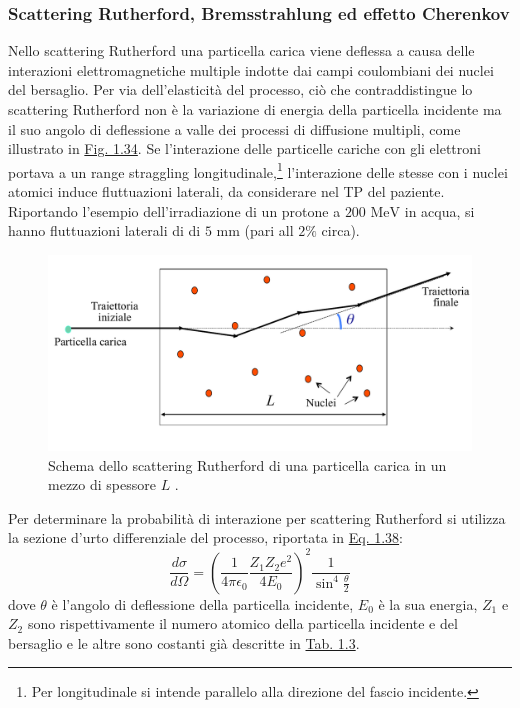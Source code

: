 \documentclass[12pt,a4paper,twoside]{report}
\begin{document}
	\subsubsection{Scattering Rutherford, Bremsstrahlung ed effetto Cherenkov}\label{par:scattering_Rutherford}
	Nello scattering Rutherford una particella carica viene deflessa a causa delle interazioni elettromagnetiche multiple indotte dai campi coulombiani dei nuclei del bersaglio. Per via dell'elasticità del processo, ciò che contraddistingue lo scattering Rutherford non è la variazione di energia della particella incidente ma il suo angolo di deflessione a valle dei processi di diffusione multipli, come illustrato in \hyperref[fig:rutherford_scattering]{Fig. 1.34}. Se l'interazione delle particelle cariche con gli elettroni portava a un range straggling longitudinale,\footnote{Per longitudinale si intende parallelo alla direzione del fascio incidente.} l'interazione delle stesse con i nuclei atomici induce fluttuazioni laterali, da considerare nel TP del paziente. Riportando l'esempio dell'irradiazione di un protone a $200\mbox{ MeV}$ in acqua, si hanno fluttuazioni laterali di di $5\mbox{ mm}$ (pari all $2\%$ circa).
	\begin{figure}[H]
		\centering
		\includegraphics[width=0.9\linewidth]{rutherford_scattering.pdf}
		\caption{Schema dello scattering Rutherford di una particella carica in un mezzo di spessore $L$ \cite{batignaniNotes}.}
		\label{fig:rutherford_scattering}
	\end{figure}
	Per determinare la probabilità di interazione per scattering Rutherford si utilizza la sezione d'urto differenziale del processo, riportata in \hyperref[eq:rutherford_scattering]{Eq. 1.38}:
	\begin{equation}
		\frac{d\sigma}{d\Omega}=\left(\frac{1}{4\pi\epsilon_0}\frac{Z_1Z_2e^2}{4E_0}\right)^2\frac{1}{\sin^4{\frac{\theta}{2}}}
		\label{eq:rutherford_scattering}
	\end{equation}
	dove $\theta$ è l'angolo di deflessione della particella incidente, $E_0$ è la sua energia, $Z_1$ e $Z_2$ sono rispettivamente il numero atomico della particella incidente e del bersaglio e le altre sono costanti già descritte in \hyperref[tab:bethe_bloch]{Tab. 1.3}.
	
\end{document}

